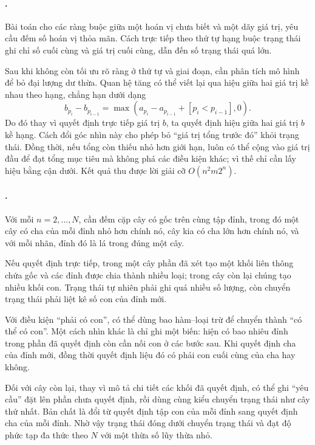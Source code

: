 \documentclass[11pt]{article}
\begin{document}
\paragraph{.}
Bài toán cho các ràng buộc giữa một hoán vị chưa biết và một dãy giá trị, yêu
cầu đếm số hoán vị thỏa mãn. Cách trực tiếp theo thứ tự hạng buộc trạng thái
ghi chỉ số cuối cùng và giá trị cuối cùng, dẫn đến số trạng thái quá lớn.

Sau khi không còn tối ưu rõ ràng ở thứ tự và giai đoạn, cần phân tích mô hình
để bỏ đại lượng dư thừa. Quan hệ tăng có thể viết lại qua hiệu giữa hai giá
trị kề nhau theo hạng, chẳng hạn dưới dạng
\[
  b_{p_i}-b_{p_{i-1}}
  =\max(a_{p_i}-a_{p_{i-1}}+[p_i<p_{i-1}],0).
\]
Do đó thay vì quyết định trực tiếp giá trị \(b\), ta quyết định hiệu giữa hai
giá trị \(b\) kề hạng. Cách đổi góc nhìn này cho phép bỏ ``giá trị tổng trước
đó'' khỏi trạng thái. Đồng thời, nếu tổng còn thiếu nhỏ hơn giới hạn, luôn có
thể cộng vào giá trị đầu để đạt tổng mục tiêu mà không phá các điều kiện khác;
vì thế chỉ cần lấy hiệu bằng cận dưới. Kết quả thu được lời giải cỡ
\(O(n^2m2^n)\).

\paragraph{.}
Với mỗi \(n=2,\ldots,N\), cần đếm cặp cây có gốc trên cùng tập đỉnh, trong đó
một cây có cha của mỗi đỉnh nhỏ hơn chính nó, cây kia có cha lớn hơn chính nó,
và với mỗi nhãn, đỉnh đó là lá trong đúng một cây.

Nếu quyết định trực tiếp, trong một cây phần đã xét tạo một khối liên thông
chứa gốc và các đỉnh được chia thành nhiều loại; trong cây còn lại chúng tạo
nhiều khối con. Trạng thái tự nhiên phải ghi quá nhiều số lượng, còn chuyển
trạng thái phải liệt kê số con của đỉnh mới.

Với điều kiện ``phải có con'', có thể dùng bao hàm--loại trừ để chuyển thành
``có thể có con''. Một cách nhìn khác là chỉ ghi một biến: hiện có bao nhiêu
đỉnh trong phần đã quyết định còn cần nối con ở các bước sau. Khi quyết định
cha của đỉnh mới, đồng thời quyết định liệu đó có phải con cuối cùng của cha
hay không.

Đối với cây còn lại, thay vì mô tả chi tiết các khối đã quyết định, có thể ghi
``yêu cầu'' đặt lên phần chưa quyết định, rồi dùng cùng kiểu chuyển trạng thái
như cây thứ nhất. Bản chất là đổi từ quyết định tập con của mỗi đỉnh sang quyết
định cha của mỗi đỉnh. Nhờ vậy trạng thái đóng dưới chuyển trạng thái và đạt độ
phức tạp đa thức theo \(N\) với một thừa số lũy thừa nhỏ.
\end{document}
